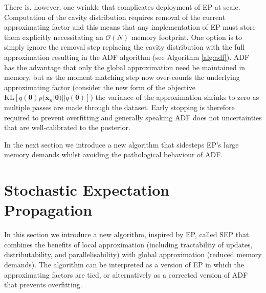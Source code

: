 There is, however, one wrinkle that complicates deployment of EP at scale. Computation of the cavity distribution requires removal of the current approximating factor and this means that any implementation of EP must store them explicitly necessitating an $\mathcal{O}(N)$ memory footprint. One option is to simply ignore the removal step replacing the cavity distribution with the full approximation resulting in the ADF algorithm (see Algorithm \ref{alg:adf}). ADF has the advantage that only the global approximation need be maintained in memory, but as the moment matching step now over-counts the underlying approximating factor (consider the new form of the objective $\mathrm{KL}[q(\mathbf{\theta}) p(\bm{x}_n | \bm{\theta}) || q(\bm{\theta})]$) the variance of the approximation shrinks to zero as multiple passes are made through the dataset. Early stopping is therefore required to prevent overfitting and generally speaking ADF does not uncertainties that are well-calibrated to the posterior. 

In the next section we introduce a new algorithm that sidesteps EP's large memory demands whilst avoiding the pathological behaviour of ADF. 

\section{Stochastic Expectation Propagation}
%
In this section we introduce a new algorithm, inspired by EP, called SEP that combines the benefits of local approximation (including tractability of updates, distributability, and parallelisability) with global approximation (reduced memory demands).  The algorithm can be interpreted as a version of EP in which the approximating factors are tied, or alternatively as a corrected version of ADF that prevents overfitting. 

